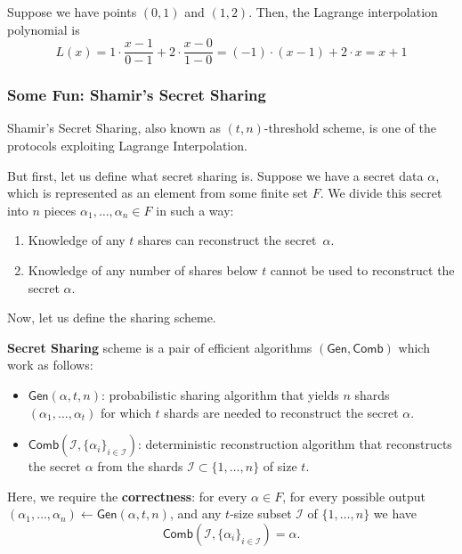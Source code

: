 \documentclass[../lecture-notes.tex]{subfiles}
\begin{document}
\begin{example}
    Suppose we have points $(0,1)$ and $(1,2)$. Then, the Lagrange interpolation polynomial is
    \begin{equation*}
        L(x) = 1 \cdot \frac{x-1}{0-1} + 2 \cdot \frac{x-0}{1-0} = (-1) \cdot (x-1) + 2 \cdot x = x + 1
    \end{equation*}
\end{example}

\subsubsection{Some Fun: Shamir's Secret Sharing}

Shamir's Secret Sharing, also known as $(t,n)$-threshold scheme, is one of the protocols exploiting Lagrange Interpolation. 

But first, let us define what secret sharing is. Suppose we have a secret data $\alpha$, which is represented as an element from some finite set $F$. We divide this secret into $n$ pieces $\alpha_1,\dots,\alpha_n \in F$ in such a way:
\begin{enumerate}
    \item Knowledge of any $t$ shares can reconstruct the secret~$\alpha$.
    \item Knowledge of any number of shares below $t$ cannot be used to reconstruct the secret $\alpha$.
\end{enumerate}

Now, let us define the sharing scheme.

\begin{definition}
    \textbf{Secret Sharing} scheme is a pair of efficient algorithms $(\mathsf{Gen}, \mathsf{Comb})$ which work as follows:
    \begin{itemize}
        \item $\mathsf{Gen}(\alpha, t, n)$: probabilistic sharing algorithm that yields $n$ shards $(\alpha_1,\dots,\alpha_t)$ for which $t$ shards are needed to reconstruct the secret $\alpha$.
        \item $\mathsf{Comb}(\mathcal{I}, \{\alpha_i\}_{i \in \mathcal{I}})$: deterministic reconstruction algorithm that reconstructs the secret $\alpha$ from the shards $\mathcal{I} \subset \{1,\dots,n\}$ of size $t$.
    \end{itemize}

    Here, we require the \textbf{correctness}: for every $\alpha \in F$, for every possible output $(\alpha_1,\dots,\alpha_n) \gets \mathsf{Gen}(\alpha, t, n)$, and any $t$-size subset $\mathcal{I}$ of $\{1,\dots,n\}$ we have
    \begin{equation*}
        \mathsf{Comb}(\mathcal{I}, \{\alpha_i\}_{i \in \mathcal{I}}) = \alpha.
    \end{equation*}
\end{definition}
\end{document}
